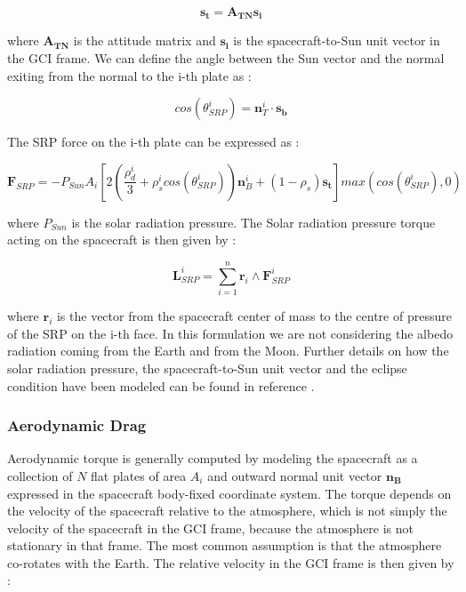 \begin{equation}
  \mathbf{s_t} = \mathbf{A_{TN}} \mathbf{s_i}
\end{equation}

where $\mathbf{A_{TN}}$ is the attitude matrix and $\mathbf{s_i}$ is the spacecraft-to-Sun unit vector in the GCI frame.
We can define the angle between the Sun vector and the normal exiting from the normal to the i-th plate as :

\begin{equation}
  cos(\theta_{SRP}^{i}) = \mathbf{n}_{T}^{i} \cdot \mathbf{s_b}
\end{equation}

The SRP force on the i-th plate can be expressed as :

\begin{equation}
  \mathbf{F}_{SRP} = - P_{Sun}A_{i}\left[ 2\left( \frac{\rho_{d}^{i}}{3} + \rho_{s}^{i}cos(\theta_{SRP}^{i}) \right) \mathbf{n}_{B}^{i} + (1 -\rho_{s}) \mathbf{s_t} \right] max(cos(\theta_{SRP}^{i}),0)
\end{equation}

where $P_{Sun}$ is the solar radiation pressure.
The Solar radiation pressure torque acting on the spacecraft is then given by :

\begin{equation}
  \mathbf{L}_{SRP}^{i} = \sum\limits_{i=1}^n  \mathbf{r}_{i} \wedge \mathbf{F}_{SRP}^{i}
\end{equation}

where $\mathbf{r}_{i}$ is the vector from the spacecraft center of mass to the centre of pressure of the SRP on the i-th face.
In this formulation we are not considering the albedo radiation coming from the Earth and from the Moon.
Further details on how the solar radiation pressure, the spacecraft-to-Sun unit vector and the eclipse condition have been modeled can be found in reference \cite{Markley2014}.

\subsubsection{Aerodynamic Drag}
Aerodynamic torque is generally computed by modeling the spacecraft as a collection of $N$ flat plates of area $A_i$ and outward normal unit vector $\mathbf{n_{B}}$ expressed in the spacecraft body-fixed coordinate system. The torque depends on the velocity of the spacecraft relative to the atmosphere, which is not simply the velocity of the spacecraft in the GCI frame, because the atmosphere is not stationary in that frame.
The most common assumption is that the atmosphere co-rotates with the Earth. The relative velocity in the GCI frame is then given by :

